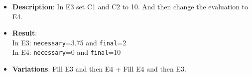 \vfill
{}
\begin{itemize}[noitemsep]
    \item \textbf{Description}: In E3 set C1 and C2 to 10. And then change the evaluation to E4.
    \item \textbf{Result}: \\
        In E3: \texttt{necessary}=3.75 and \texttt{final}=2 \\
        In E4: \texttt{necessary}=0 and \texttt{final}=10
    \item \textbf{Variations}: Fill E3 and then E4 + Fill E4 and then E3.
\end{itemize}
\vfill



